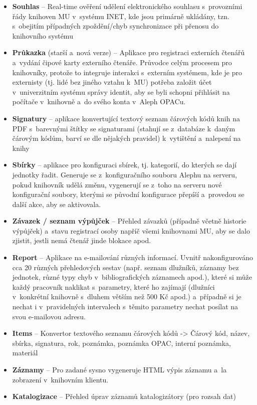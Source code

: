 \documentclass[
	11pt, oneside, printed, final, palatino, monochrome
	microtype,
	table,   %
	lof,     %
	lot     %
]{fithesis3}
\newcommand{\bold}[1]{\textbf{#1}}
\begin{document}
{\begin{itemize}
\item \bold{Souhlas} – Real-time ověření udělení elektronického souhlasu s~provozními řády knihoven MU v~systému INET, kde jsou primárně ukládány, tzn. s~obejitím případných zpoždění/chyb synchronizace při přenosu do knihovního systému
\item \bold{Průkazka} (starší a~nová verze) – Aplikace pro registraci externích čtenářů a~vydání čipové karty externího čtenáře. Průvodce celým procesem pro knihovníky, protože to integruje interakci s~externím systémem, kde je pro externisty (tj. lidé bez jiného vztahu k~MU) potřeba založit účet v~univerzitním systému správy identit, aby se byli schopni přihlásit na počítače v~knihovně a~do svého konta v~Aleph OPACu.
\item \bold{Signatury} – aplikace konvertující textový seznam čárových kódů knih na PDF s~barevnými štítky se signaturami (stahují se z~databáze k~daným čárovým kódům, barví se dle nějakých pravidel) k~vytištění a~nalepení na knihy
\item \bold{Sbírky} – aplikace pro konfiguraci sbírek, tj. kategorií, do kterých se dají jednotky řadit. Generuje se z~konfiguračního souboru Alephu na serveru, pokud knihovník udělá změnu, vygenerují se z~toho na serveru nové konfigurační soubory, kterými se původní konfigurace přepíší a~provedou se další akce, aby se aktivovala.
\item \bold{Závazek / seznam výpůjček} – Přehled závazků (případně včetně historie výpůjček) a~stavu registrací osoby napříč všemi knihovnami MU, aby se dalo zjistit, jestli nemá čtenář jinde blokace apod.
\item \bold{Report} – Aplikace na e-mailování různých informací. Uvnitř nakonfigurováno cca 20 různých přehledových sestav (např. seznam dlužníků, záznamy bez jednotek, různé typy chyb v~bibliografických záznamech apod.), které si může každý pracovník naklikat s~parametry, které ho zajímají (dlužníci v~konkrétní knihovně s~dluhem větším než 500 Kč apod.) a~případně si je nechat i v~pravidelných intervalech s~těmito parametry nechat posílat na svou e-mailovou adresu.
\item \bold{Items} – Konvertor textového seznamu čárových kódů -> Čárový kód, název, sbírka, signatura, rok, poznámka, poznámka OPAC, interní poznámka, materiál
\item \bold{Záznamy} – Pro zadané sysno vygeneruje HTML výpis záznamu a~la zobrazení v~knihovním klientu.
\item \bold{Katalogizace} – Přehled úprav záznamů katalogizátory (pro rozsah dat)

\end{itemize}}
\end{document}
